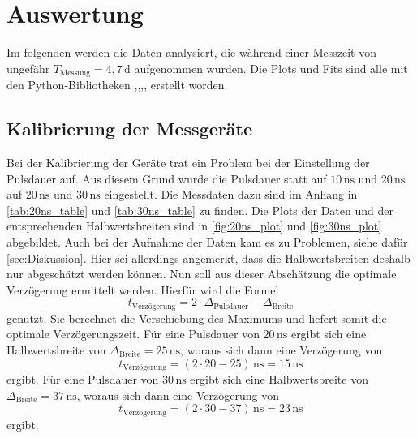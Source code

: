 \section{Auswertung}
\label{sec:Auswertung}

Im folgenden werden die Daten analysiert, die während einer Messzeit von ungefähr $T_\text{Messung} = 4{,}7  \, \unit\day$ aufgenommen wurden.
Die Plots und Fits sind alle mit den Python-Bibliotheken \cite{matplotlib},\cite{numpy},\cite{scipy},\cite{uncertainties},\cite{reback2020pandas} erstellt worden.
\subsection{Kalibrierung der Messgeräte}

Bei der Kalibrierung der Geräte trat ein Problem bei der Einstellung der Pulsdauer auf.
Aus diesem Grund wurde die Pulsdauer statt auf $10 \, \unit{\nano\second}$ und $20 \, \unit{\nano\second}$ auf $20 \, \unit{\nano\second}$ und $30 \, \unit{\nano\second}$ eingestellt.
Die Messdaten dazu sind im Anhang in \autoref{tab:20ns_table} und \autoref{tab:30ns_table} zu finden.
Die Plots der Daten und der entsprechenden Halbwertsbreiten sind in \autoref{fig:20ns_plot} und \autoref{fig:30ns_plot} abgebildet.
Auch bei der Aufnahme der Daten kam es zu Problemen, siehe dafür \autoref{sec:Diskussion}.
Hier sei allerdings angemerkt, dass die Halbwertsbreiten deshalb nur abgeschätzt werden können.
Nun soll aus dieser Abschätzung die optimale Verzögerung ermittelt werden.
Hierfür wird die Formel
\begin{equation*}
    t_\text{Verzögerung} = 2 \cdot \Delta_\text{Pulsdauer} - \Delta_\text{Breite}
\end{equation*}
genutzt. Sie berechnet die Verschiebung des Maximums und liefert somit die optimale Verzögerungszeit.
Für eine Pulsdauer von $20 \, \unit{\nano\second}$ ergibt sich eine Halbwertsbreite von $\Delta_\text{Breite} = 25 \, \unit{\nano\second}$, woraus sich dann eine Verzögerung von
\begin{equation*}
    t_\text{Verzögerung} = (2 \cdot 20 - 25) \, \unit{\nano\second} = 15 \, \unit{\nano\second}
\end{equation*}
ergibt.
Für eine Pulsdauer von $30 \, \unit{\nano\second}$ ergibt sich eine Halbwertsbreite von $\Delta_\text{Breite} = 37 \, \unit{\nano\second}$, woraus sich dann eine Verzögerung von
\begin{equation*}
    t_\text{Verzögerung} = (2 \cdot 30 - 37) \, \unit{\nano\second} = 23 \, \unit{\nano\second}
\end{equation*}
ergibt.

